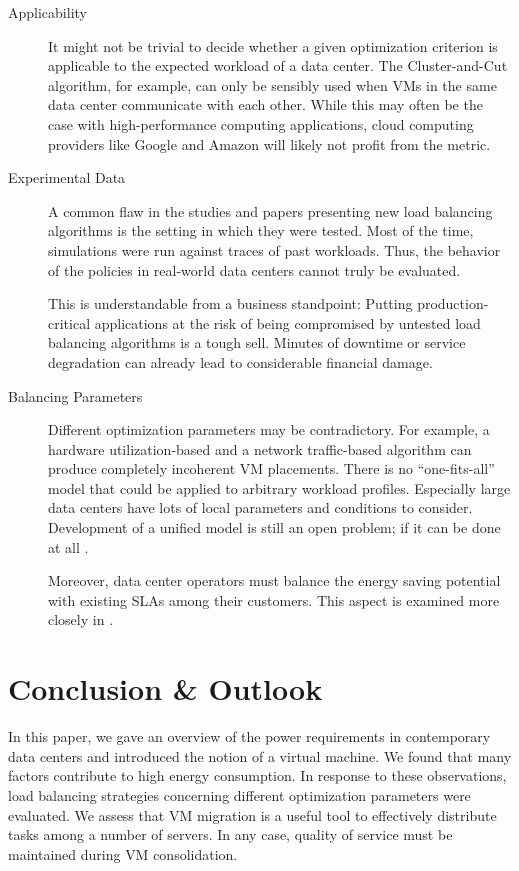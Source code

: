 \documentclass[12pt, a4paper]{scrartcl}
\begin{document}
\begin{description}
    \item[Applicability]
        It might not be trivial to decide whether a given optimization criterion is applicable to the expected workload of a data center.
        The Cluster-and-Cut algorithm, for example, can only be sensibly used when \acp{VM} in the same data center communicate with each other.
        While this may often be the case with high-performance computing applications, cloud computing providers like Google and Amazon will likely not profit from the metric.

    \item[Experimental Data]
        A common flaw in the studies and papers presenting new load balancing algorithms is the setting in which they were tested.
        Most of the time, simulations were run against traces of past workloads.
        Thus, the behavior of the policies in real-world data centers cannot truly be evaluated.

        This is understandable from a business standpoint:
        Putting production-critical applications at the risk of being compromised by untested load balancing algorithms is a tough sell.
        Minutes of downtime or service degradation can already lead to considerable financial damage.

    \item[Balancing Parameters]
        Different optimization parameters may be contradictory.
        For example, a hardware utilization-based and a network traffic-based algorithm can produce completely incoherent \ac{VM} placements.
        There is no \enquote{one-fits-all} model that could be applied to arbitrary workload profiles.
        Especially large data centers have lots of local parameters and conditions to consider.
        Development of a unified model is still an open problem; if it can be done at all \cite{meng_traffic_aware_2010}.

        Moreover, data center operators must balance the energy saving potential with existing \acp{SLA} among their customers.
        This aspect is examined more closely in \cite{gmach_resource_2009}.
\end{description}

\section{Conclusion \& Outlook}\label{sec:conclusion}
In this paper, we gave an overview of the power requirements in contemporary data centers and introduced the notion of a virtual machine.
We found that many factors contribute to high energy consumption.
In response to these observations, load balancing strategies concerning different optimization parameters were evaluated.
We assess that \ac{VM} migration is a useful tool to effectively distribute tasks among a number of servers.
In any case, quality of service must be maintained during \ac{VM} consolidation.
\end{document}
